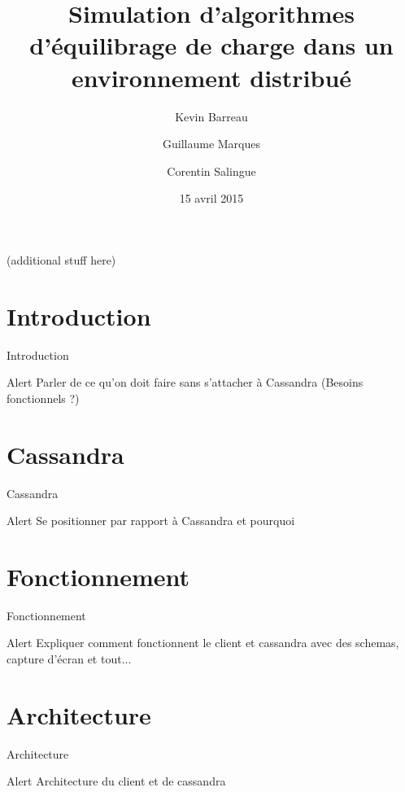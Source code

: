 \documentclass{beamer}
\title[Projet de Programmation]{Simulation d'algorithmes \\d'équilibrage de charge dans un \\environnement distribué}
\author{Kevin Barreau \and Guillaume Marques \and Corentin Salingue}
\institute{Université de Bordeaux}
\date{15 avril 2015}
\begin{document}
\mode* %



%
\begin{frame}
\titlepage
(additional stuff here)
\end{frame}


\section{Introduction}

\begin{frame}{Introduction}

\begin{alertblock}{Alert}
    Parler de ce qu'on doit faire sans s'attacher à Cassandra (Besoins fonctionnels ?)
\end{alertblock}
\end{frame}


\section{Cassandra}

\begin{frame}{Cassandra}

\begin{alertblock}{Alert}
    Se positionner par rapport à Cassandra et pourquoi
\end{alertblock}
\end{frame}


\section{Fonctionnement}

\begin{frame}{Fonctionnement}

\begin{alertblock}{Alert}
    Expliquer comment fonctionnent le client et cassandra avec des schemas, capture d'écran et tout...
\end{alertblock}
\end{frame}


\section{Architecture}

\begin{frame}{Architecture}

\begin{alertblock}{Alert}
    Architecture du client et de cassandra
\end{alertblock}
\end{frame}
\end{document}

